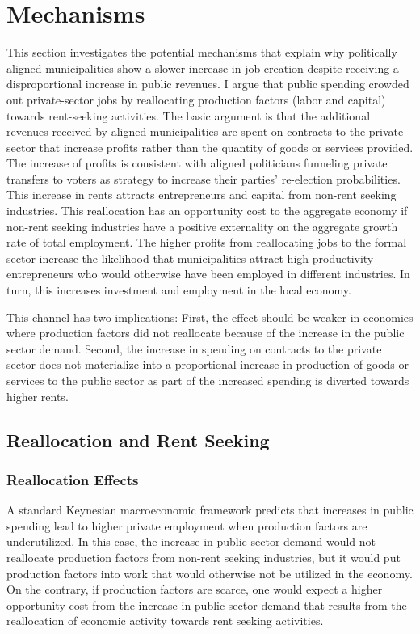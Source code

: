\documentclass[dv_diss_main.tex]{subfiles}
\begin{document}
\section{Mechanisms} 

This section investigates the potential mechanisms that explain why politically aligned municipalities show a slower increase in job creation despite receiving a disproportional increase in public revenues. 
I argue that public spending crowded out private-sector jobs by reallocating production factors (labor and capital) towards rent-seeking activities. 
The basic argument is that the additional revenues received by aligned municipalities are spent on contracts to the private sector that increase profits rather than the quantity of goods or services provided. The increase of profits is consistent with aligned politicians funneling private transfers to voters as strategy to increase their parties' re-election probabilities. 
This increase in rents attracts entrepreneurs and capital from non-rent seeking industries. This reallocation has an opportunity cost to the aggregate economy if non-rent seeking industries have a positive externality on the aggregate growth rate of total employment. The higher profits from reallocating jobs to the formal sector increase the likelihood that municipalities attract high productivity entrepreneurs who would otherwise have been employed in different industries. In turn, this increases investment and employment in the local economy. 

This channel has two implications: First, the effect should be weaker in economies where production factors did not reallocate because of the increase in the public sector demand. Second, the increase in spending on contracts to the private sector does not materialize into a proportional increase in production of goods or services to the public sector as part of the increased spending is diverted towards higher rents. 


\subsection{Reallocation and Rent Seeking}

\subsubsection{Reallocation Effects} 

A standard Keynesian macroeconomic framework predicts that increases in public spending lead to higher private employment when production factors are underutilized. In this case, the increase in public sector demand would not reallocate production factors from non-rent seeking industries, but it would put production factors into work that would otherwise not be utilized in the economy. On the contrary, if production factors are scarce, one would expect a higher opportunity cost from the increase in public sector demand that results from the reallocation of economic activity towards rent seeking activities. 
\end{document}
